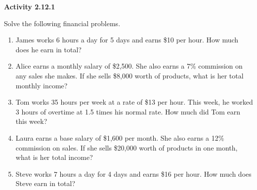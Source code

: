  \vspace{1ex}
\noindent\textbf{Activity 2.12.1}

\vspace{0.75ex}


Solve the following financial problems. 
\begin{enumerate}[noitemsep, label = \color{blue}\arabic*. ]
    \item James works 6 hours a day for 5 days and earns \$10 per hour. How much does he earn in total?
    \item Alice earns a monthly salary of \$2,500. She also earns a 7\% commission on any sales she makes. If she sells \$8,000 worth of products, what is her total monthly income?
    \item Tom works 35 hours per week at a rate of \$13 per hour. This week, he worked 3 hours of overtime at 1.5 times his normal rate. How much did Tom earn this week?
    \item Laura earns a base salary of \$1,600 per month. She also earns a 12\% commission on sales. If she sells \$20,000 worth of products in one month, what is her total income?
    \item Steve works 7 hours a day for 4 days and earns \$16 per hour. How much does Steve earn in total?
\end{enumerate}

